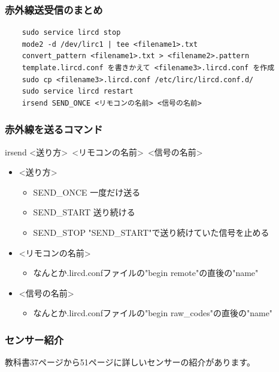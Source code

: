 \documentclass[slide05.tex]{subfiles}
\begin{document}
\begin{frame}[fragile]
    \frametitle{赤外線送受信のまとめ}
    \begin{lstlisting}
    sudo service lircd stop
    mode2 -d /dev/lirc1 | tee <filename1>.txt
    convert_pattern <filename1>.txt > <filename2>.pattern
    template.lircd.conf を書きかえて <filename3>.lircd.conf を作成
    sudo cp <filename3>.lircd.conf /etc/lirc/lircd.conf.d/
    sudo service lircd restart
    irsend SEND_ONCE <リモコンの名前> <信号の名前>
    \end{lstlisting}
\end{frame}

\begin{frame}
    \frametitle{赤外線を送るコマンド}
    irsend \textless 送り方\textgreater\ \textless リモコンの名前\textgreater\ \textless 信号の名前\textgreater

    \begin{itemize}
        \item \textless 送り方\textgreater
        \begin{itemize}
            \item SEND\_ONCE 一度だけ送る
            \item SEND\_START 送り続ける
            \item SEND\_STOP "SEND\_START"で送り続けていた信号を止める
        \end{itemize}
        \item \textless リモコンの名前\textgreater
        \begin{itemize}
            \item なんとか.lircd.confファイルの"begin remote"の直後の"name"
        \end{itemize}
        \item \textless 信号の名前\textgreater
        \begin{itemize}
            \item なんとか.lircd.confファイルの"begin raw\_codes"の直後の"name"
        \end{itemize}
    \end{itemize}
\end{frame}

\begin{frame}
    \frametitle{センサー紹介}
    教科書37ページから51ページに詳しいセンサーの紹介があります。
\end{frame}
\end{document}
